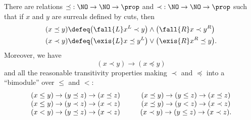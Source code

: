 %
\begin{thm}\label{defn:No-codes}
  There are relations $\mathord\preceq:\NO\to\NO\to\prop$ and $\mathord\prec:\NO\to\NO\to\prop$ such that if $x$ and $y$ are surreals defined by cuts, then
  \begin{align*}
    (x\preceq y) &\defeq
    \big(\fall{L} x^L\prec y\big) \land \big(\fall{R} x\prec y^R\big)\\
    (x\prec y) &\defeq
    \big(\exis{L} x\preceq y^L\big) \lor \big(\exis{R} x^R \preceq y\big).
  \end{align*}
  Moreover, we have
  \begin{equation}\label{eq:NO-codes-unstrict}
    (x\prec y) \to (x\preceq y)
  \end{equation}
  and all the reasonable transitivity properties making $\prec$ and $\preceq$ into a ``bimodule'' over $\le$ and $<$:
  \begin{equation}\label{eq:NO-codes-transitivity}
    \begin{array}{c@{\hspace{1cm}}c}
      (x \le y) \to (y\preceq z) \to (x\preceq z) &
      (x \preceq y) \to (y\le z) \to (x\preceq z) \\
      (x \le y) \to (y\prec z) \to (x\prec z) &
      (x \preceq y) \to (y< z) \to (x\prec z) \\
      (x < y) \to (y\preceq z) \to (x\prec z) &
      (x \prec y) \to (y\le z) \to (x\prec z).
  \end{array}
  \end{equation}
\end{thm}

